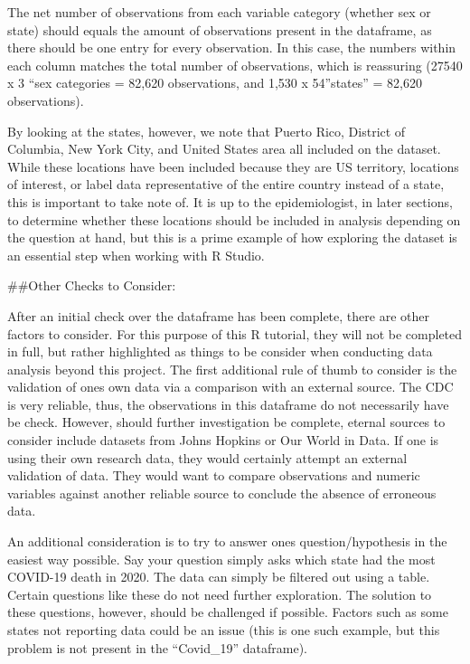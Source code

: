 \documentclass[
]{article}
\begin{document}
The net number of observations from each variable category (whether sex
or state) should equals the amount of observations present in the
dataframe, as there should be one entry for every observation. In this
case, the numbers within each column matches the total number of
observations, which is reassuring (27540 x 3 ``sex categories = 82,620
observations, and 1,530 x 54''states'' = 82,620 observations).

By looking at the states, however, we note that Puerto Rico, District of
Columbia, New York City, and United States area all included on the
dataset. While these locations have been included because they are US
territory, locations of interest, or label data representative of the
entire country instead of a state, this is important to take note of. It
is up to the epidemiologist, in later sections, to determine whether
these locations should be included in analysis depending on the question
at hand, but this is a prime example of how exploring the dataset is an
essential step when working with R Studio.

\#\#Other Checks to Consider:

After an initial check over the dataframe has been complete, there are
other factors to consider. For this purpose of this R tutorial, they
will not be completed in full, but rather highlighted as things to be
consider when conducting data analysis beyond this project. The first
additional rule of thumb to consider is the validation of ones own data
via a comparison with an external source. The CDC is very reliable,
thus, the observations in this dataframe do not necessarily have be
check. However, should further investigation be complete, eternal
sources to consider include datasets from Johns Hopkins or Our World in
Data. If one is using their own research data, they would certainly
attempt an external validation of data. They would want to compare
observations and numeric variables against another reliable source to
conclude the absence of erroneous data.

An additional consideration is to try to answer ones question/hypothesis
in the easiest way possible. Say your question simply asks which state
had the most COVID-19 death in 2020. The data can simply be filtered out
using a table. Certain questions like these do not need further
exploration. The solution to these questions, however, should be
challenged if possible. Factors such as some states not reporting data
could be an issue (this is one such example, but this problem is not
present in the ``Covid\_19'' dataframe).
\end{document}
